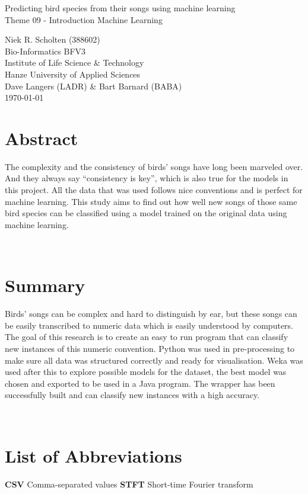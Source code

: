 \begin{center}


    \Huge{Predicting bird species from their songs using machine learning}\\
    \vspace{\baselineskip}
    \LARGE{Theme 09 - Introduction Machine Learning}\\
    \vspace{\baselineskip}

\end{center}
\vspace{\baselineskip}

\normalsize
\vspace*{\fill}
\begin{flushright}
    Niek R. Scholten (388602)\\
    Bio-Informatics BFV3\\
    Institute of Life Science \& Technology\\
    Hanze University of Applied Sciences\\
    Dave Langers (LADR) \& Bart Barnard (BABA)\\
    \today
\end{flushright}
\newpage

\section*{Abstract}

The complexity and the consistency of birds' songs have long been marveled over.
And they always say ``consistency is key'', which is also true for the models in this project.
All the data that was used follows nice conventions and is perfect for machine learning.
This study aims to find out how well new songs of those same bird species can be classified using a model trained on the original data using machine learning.

\label{sec:abstract}~
\newpage

\section*{Summary}

Birds' songs can be complex and hard to distinguish by ear, but these songs can be easily transcribed to numeric data which is easily understood by computers.
The goal of this research is to create an easy to run program that can classify new instances of this numeric convention.
Python was used in pre-processing to make sure all data was structured correctly and ready for visualisation.
Weka was used after this to explore possible models for the dataset, the best model was chosen and exported to be used in a Java program.
The wrapper has been successfully built and can classify new instances with a high accuracy.

\label{sec:summ}~
\newpage

\section*{List of Abbreviations}

\textbf{CSV} Comma-separated values
\textbf{STFT} Short-time Fourier transform

\label{sec:abvs}~

\newpage